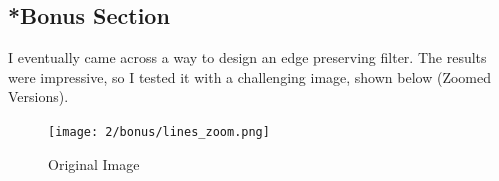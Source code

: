 \documentclass{article}
\begin{document}
    
    \pagebreak

    \subsection*{*Bonus Section}
    I eventually came across a way to design an edge preserving filter. The results were impressive, so I tested it with a challenging image, shown below (Zoomed Versions).
    
    \begin{figure}[!htb]
      \begin{center}
        \texttt{[image: 2/bonus/lines\_zoom.png]}
       \caption{Original Image}
      \end{center}
    \endminipage\hfill
    \end{figure}
    
\end{document}
